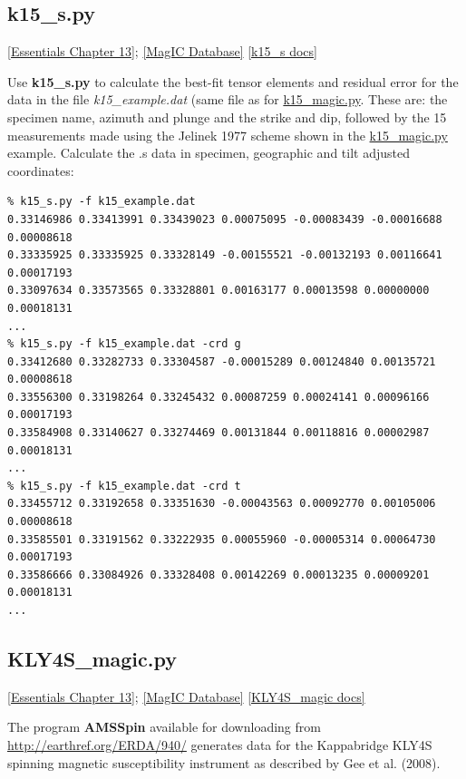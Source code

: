 \documentclass[11pt]{book}
\begin{document}
{{
\subsection{k15\_s.py}
\href{http://earthref.org/MAGIC/books/Tauxe/Essentials/WebBook3ch13.html#ch13}{[Essentials Chapter 13]};
\href{#MagICDatabase}{[MagIC Database]}
\href{https://github.com/PmagPy/PmagPy/blob/master/programs/k15_s.py}{[k15\_s docs]}

%
Use {\bf k15\_s.py} to calculate the best-fit tensor elements and residual error for the data in the file {\it k15\_example.dat} (same file as for \href{#k15_magic.py}{k15\_magic.py}.  These are: the specimen name, azimuth and plunge and the strike and dip, followed by the 15 measurements made using the Jelinek 1977 \nocite{jelinek77} scheme shown in the \href{#k15_magic.py}{k15\_magic.py} example.  Calculate the .s data in specimen, geographic  and tilt adjusted coordinates:

\begin{verbatim}
% k15_s.py -f k15_example.dat
0.33146986 0.33413991 0.33439023 0.00075095 -0.00083439 -0.00016688 0.00008618
0.33335925 0.33335925 0.33328149 -0.00155521 -0.00132193 0.00116641 0.00017193
0.33097634 0.33573565 0.33328801 0.00163177 0.00013598 0.00000000 0.00018131
...
% k15_s.py -f k15_example.dat -crd g
0.33412680 0.33282733 0.33304587 -0.00015289 0.00124840 0.00135721 0.00008618
0.33556300 0.33198264 0.33245432 0.00087259 0.00024141 0.00096166 0.00017193
0.33584908 0.33140627 0.33274469 0.00131844 0.00118816 0.00002987 0.00018131
...
% k15_s.py -f k15_example.dat -crd t
0.33455712 0.33192658 0.33351630 -0.00043563 0.00092770 0.00105006 0.00008618
0.33585501 0.33191562 0.33222935 0.00055960 -0.00005314 0.00064730 0.00017193
0.33586666 0.33084926 0.33328408 0.00142269 0.00013235 0.00009201 0.00018131
...
\end{verbatim}

%


\subsection{KLY4S\_magic.py}  \href{http://earthref.org/MAGIC/books/Tauxe/Essentials/WebBook3ch13.html#ch13}{[Essentials Chapter 13]};
\href{#MagICDatabase}{[MagIC Database]}
\href{https://github.com/PmagPy/PmagPy/blob/master/programs/KLY4S_magic.py}{[KLY4S\_magic docs]}

The program {\bf AMSSpin} available for downloading from \url{http://earthref.org/ERDA/940/}  generates data for the Kappabridge KLY4S spinning magnetic susceptibility instrument as described by Gee et al. (2008).  \nocite{gee08}

}}
\end{document}
